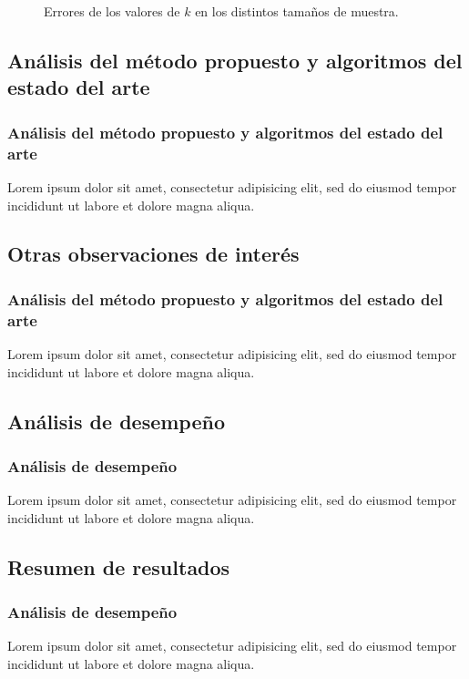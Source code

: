 \begin{frame}[allowframebreaks]
\begin{figure}
{
		}
		\caption{Errores de los valores de \(k\) en los distintos tamaños de muestra.}
		\label{fig:errores-k-tamanos-muestra}
	\end{figure}
\end{frame}

\subsection{Análisis del método propuesto y algoritmos del estado del arte}
\begin{frame}[allowframebreaks]
	\frametitle{Análisis del método propuesto y algoritmos del estado del arte}
	Lorem ipsum dolor sit amet, consectetur adipisicing elit, sed do eiusmod tempor incididunt ut labore et dolore magna aliqua.
\end{frame}

\subsection{Otras observaciones de interés}
\begin{frame}[allowframebreaks]
	\frametitle{Análisis del método propuesto y algoritmos del estado del arte}
	Lorem ipsum dolor sit amet, consectetur adipisicing elit, sed do eiusmod tempor incididunt ut labore et dolore magna aliqua.
\end{frame}

\subsection{Análisis de desempeño}
\begin{frame}[allowframebreaks]
	\frametitle{Análisis de desempeño}
	Lorem ipsum dolor sit amet, consectetur adipisicing elit, sed do eiusmod tempor incididunt ut labore et dolore magna aliqua.
\end{frame}

\subsection{Resumen de resultados}
\begin{frame}[allowframebreaks]
	\frametitle{Análisis de desempeño}
	Lorem ipsum dolor sit amet, consectetur adipisicing elit, sed do eiusmod tempor incididunt ut labore et dolore magna aliqua.
\end{frame}